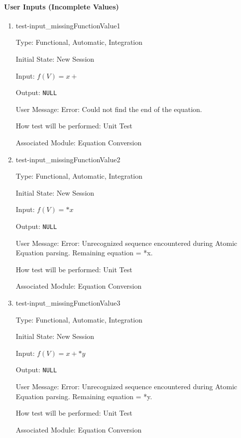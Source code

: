 \documentclass[12pt, titlepage]{article}
\begin{document}
\paragraph{User Inputs (Incomplete Values)}

\begin{enumerate}
	
	\item{test-input\_missingFunctionValue1}
	
	Type: Functional, Automatic, Integration
	
	Initial State: New Session
	
	Input: $f(V) = x +$
	
	Output: \texttt{NULL}
	
	User Message: Error: Could not find the end of the equation. 
	
	How test will be performed: Unit Test
	
	Associated Module: Equation Conversion\\
	
	\item{test-input\_missingFunctionValue2}
	
	Type: Functional, Automatic, Integration
	
	Initial State: New Session
	
	Input: $f(V) = *x$
	
	Output:	\texttt{NULL}
	
	User Message: Error: Unrecognized sequence encountered during Atomic 
	Equation parsing. Remaining equation = *x.
	
	How test will be performed: Unit Test
	
	Associated Module: Equation Conversion\\
	
	\item{test-input\_missingFunctionValue3}
	
	Type: Functional, Automatic, Integration
	
	Initial State: New Session
	
	Input: $f(V) = x + * y$
	
	Output:	\texttt{NULL}
	
	User Message: Error: Unrecognized sequence encountered during Atomic 
	Equation 
	parsing. Remaining equation = *y.
	
	How test will be performed: Unit Test
	
	Associated Module: Equation Conversion\\
	

\end{enumerate}
\end{document}
